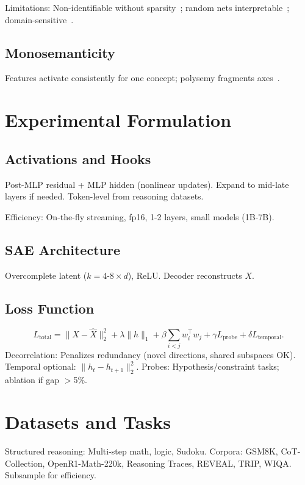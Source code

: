 \documentclass{article}
\begin{document}
Limitations: Non-identifiable without sparsity~\citep{SAE-Identifiability}; random nets interpretable~\citep{SAE-Random}; domain-sensitive~\citep{SAE-Domain,SAE-Empirical}.

\subsection{Monosemanticity}
Features activate consistently for one concept; polysemy fragments axes~\citep{Zhu2025AbsTopK}.

\section{Experimental Formulation}
\subsection{Activations and Hooks}
Post-MLP residual + MLP hidden (nonlinear updates). Expand to mid-late layers if needed. Token-level from reasoning datasets.

Efficiency: On-the-fly streaming, fp16, 1-2 layers, small models (1B-7B).

\subsection{SAE Architecture}
Overcomplete latent ($k=4$-$8 \times d$), ReLU. Decoder reconstructs $X$.

\subsection{Loss Function}
\[
L_\text{total} = \|X - \hat{X}\|_2^2 + \lambda \|h\|_1 + \beta \sum_{i<j} w_i^\top w_j + \gamma L_\text{probe} + \delta L_\text{temporal}.
\]
Decorrelation: Penalizes redundancy (novel directions, shared subspaces OK). Temporal optional: $\|h_t - h_{t+1}\|_2^2$. Probes: Hypothesis/constraint tasks; ablation if gap $>$5\%.

\section{Datasets and Tasks}
Structured reasoning: Multi-step math, logic, Sudoku. Corpora: GSM8K, CoT-Collection, OpenR1-Math-220k, Reasoning Traces, REVEAL, TRIP, WIQA. Subsample for efficiency.
\end{document}
